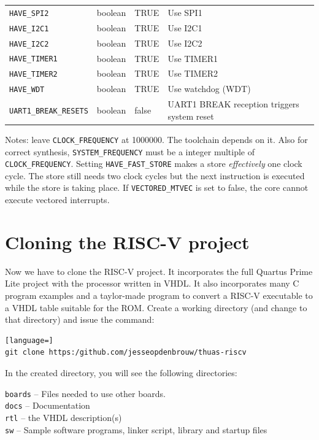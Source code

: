 \documentclass[12pt]{article}
\begin{document}
\begin{table}[!ht]
\begin{tabular}{lllp{5.5cm}}
\lstinline|HAVE_SPI2| & boolean & TRUE & Use SPI1 \\
\lstinline|HAVE_I2C1| & boolean & TRUE & Use I2C1 \\
\lstinline|HAVE_I2C2| & boolean & TRUE & Use I2C2 \\
\lstinline|HAVE_TIMER1| & boolean & TRUE & Use TIMER1\\
\lstinline|HAVE_TIMER2| & boolean & TRUE & Use TIMER2\\
\lstinline|HAVE_WDT| & boolean & TRUE & Use watchdog (WDT) \\
\lstinline|UART1_BREAK_RESETS| & boolean & false & UART1 BREAK reception triggers system reset\\
\bottomrule
\end{tabular}
\end{table}

Notes: leave \lstinline|CLOCK_FREQUENCY| at 1000000. The toolchain depends on it. Also for correct synthesis, \lstinline|SYSTEM_FREQUENCY| must be a integer multiple of \lstinline|CLOCK_FREQUENCY|.
Setting \lstinline|HAVE_FAST_STORE| makes a store \emph{effectively} one clock cycle. The store still needs two clock cycles but the next instruction is executed while the store is taking place. If \lstinline|VECTORED_MTVEC| is set to false, the core cannot execute vectored interrupts.

\section{Cloning the RISC-V project}
\label{sec:cloning}
Now we have to clone the RISC-V project. It incorporates the full Quartus Prime Lite project with the processor written in VHDL. It also incorporates many C program examples and a taylor-made program to convert a RISC-V executable to a VHDL table suitable for the ROM. Create a working directory (and change to that directory) and issue the command:

\begin{lstlisting}[language=]
git clone https:/github.com/jesseopdenbrouw/thuas-riscv
\end{lstlisting}

In the created directory, you will see the following directories:

\lstinline|boards| -- Files needed to use other boards.\\
\lstinline|docs| -- Documentation \\
\lstinline|rtl| -- the VHDL description(s)\\
\lstinline|sw| -- Sample software programs, linker script, library and startup files
\end{document}
